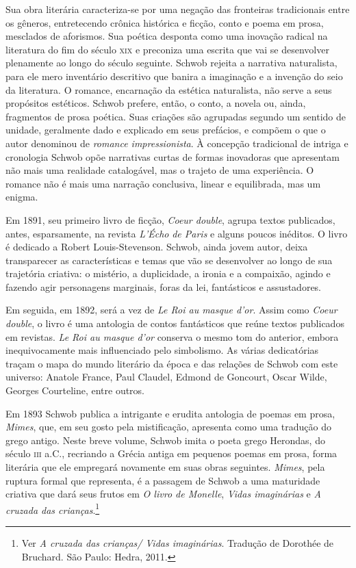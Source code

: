 Sua obra literária caracteriza-se por uma negação das fronteiras
tradicionais entre os gêneros, entretecendo crônica histórica e ficção, conto e
poema em prosa, mesclados de aforismos. Sua poética desponta como uma inovação
radical na literatura do fim do século \textsc{xix} e preconiza uma escrita que vai se
desenvolver plenamente ao longo do século seguinte. Schwob rejeita a narrativa
naturalista, para ele mero inventário descritivo que banira a imaginação e a
invenção do seio da literatura. O romance, encarnação da estética naturalista,
não serve a seus propósitos estéticos. Schwob prefere, então, o conto, a novela
ou, ainda, fragmentos de prosa poética. Suas criações são agrupadas segundo um
sentido de unidade, geralmente dado e explicado em seus prefácios, e compõem o
que o autor denominou de \textit{romance impressionista}. À concepção
tradicional de intriga e cronologia Schwob opõe narrativas curtas de formas
inovadoras que apresentam não mais uma realidade catalogável, mas o trajeto de
uma experiência. O romance não é mais uma narração conclusiva, linear e
equilibrada, mas um enigma.

Em 1891, seu primeiro livro de ficção, \textit{Coeur double}, agrupa textos
publicados, antes, esparsamente, na revista \textit{L’Écho}\textit{ de Paris} e
alguns poucos inéditos. O livro é dedicado a Robert Louis-Stevenson. Schwob,
ainda jovem autor, deixa transparecer as características e temas que vão se
desenvolver ao longo de sua trajetória criativa: o mistério, a duplicidade, a
ironia e a compaixão, agindo e fazendo agir personagens marginais, foras da
lei, fantásticos e assustadores.

Em seguida, em 1892, será a vez de \textit{Le Roi au masque d’or}. Assim
como \textit{Coeur double}, o livro é uma antologia de contos fantásticos que
reúne textos publicados em revistas. \textit{Le Roi
au masque d’or} conserva o mesmo tom do anterior, embora inequivocamente mais
influenciado pelo simbolismo. As várias dedicatórias traçam o mapa do mundo
literário da época e das relações de Schwob com este universo: Anatole France,
Paul Claudel, Edmond de Goncourt, Oscar Wilde, Georges Courteline, entre outros.

Em 1893 Schwob publica a intrigante e erudita antologia de poemas em prosa,
\textit{Mimes}, que, em seu gosto pela mistificação, apresenta como uma
tradução do grego antigo. Neste breve volume, Schwob imita o poeta grego
Herondas, do século \textsc{iii} a.C., recriando a Grécia antiga em pequenos poemas em
prosa, forma literária que ele empregará novamente em suas obras seguintes.
\textit{Mimes}, pela ruptura formal que representa, é a passagem de Schwob a uma 
maturidade criativa que
dará seus frutos em \textit{O livro de Monelle}, \textit{Vidas imaginárias} e 
\textit{A cruzada das crianças}.\footnote{ Ver \textit{A cruzada das crianças/ Vidas imaginárias}. 
Tradução de Dorothée de Bruchard. São Paulo: Hedra, 2011.}

